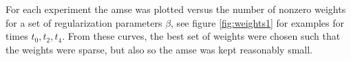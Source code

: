 \documentclass[11pt]{article}
\begin{document}
For each experiment the amse was plotted versus the number of nonzero weights for a set of regularization parameters $\beta$, see figure \ref{fig:weights1} for examples for times $t_0,t_2,t_4$. From these curves, the best set of weights were chosen such that the weights were sparse, but also so the amse was kept reasonably small. 
\end{document}
